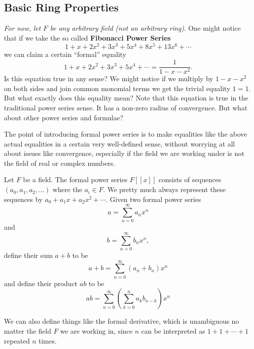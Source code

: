 \subsection{Basic Ring Properties}

\textit{For now, let $F$ be any arbitrary field (not an arbitrary ring)}. One might notice that if we take the so called \textbf{Fibonacci Power Series} 
\[1 + x + 2x^2 + 3x^3 + 5x^4 + 8x^5 + 13x^6 + \cdots\] we can claim a certain ``formal'' equality
\[1 + x + 2x^2 + 3x^3 + 5x^4 + \cdots = \frac{1}{1 - x - x^2}.\]
Is this equation true in any sense? We might notice if we multiply by $1 - x - x^2$ on both sides and join common monomial terms we get the trivial equality $1 = 1$. But what exactly does this equality mean? Note that this equation is true in the traditional power series sense. It has a non-zero radius of convergence. But what about other power series and formulae?

The point of introducing formal power series is to make equalities like the above actual equalities in a certain very well-defined sense, without worrying at all about issues like convergence, especially if the field we are working under is not the field of real or complex numbers.

\begin{definition}
Let $F$ be a field. The formal power series $F[[x]]$ consists of sequences $(a_0, a_1, a_2, \dots)$ where the $a_i \in F$. We pretty much always represent these sequences by $a_0 + a_1x + a_2x^2 + \cdots$. Given two formal power series
\[a = \sum_{n = 0}^{\infty}a_nx^n\] and
\[b = \sum_{n = 0}^{\infty}b_nx^n,\] define their sum $a+b$ to be
\[a + b = \sum_{n=0}^{\infty}(a_n + b_n)x^n\] and
define their product $ab$ to be
\[ab = \sum_{n = 0}^{\infty}\left(\sum_{k = 0}^na_kb_{n-k}\right)x^n\]

We can also define things like the formal derivative, which is unambiguous no matter the field $F$ we are working in, since $n$ can be interpreted as $1 + 1 + \cdots + 1$ repeated $n$ times.
\end{definition}

